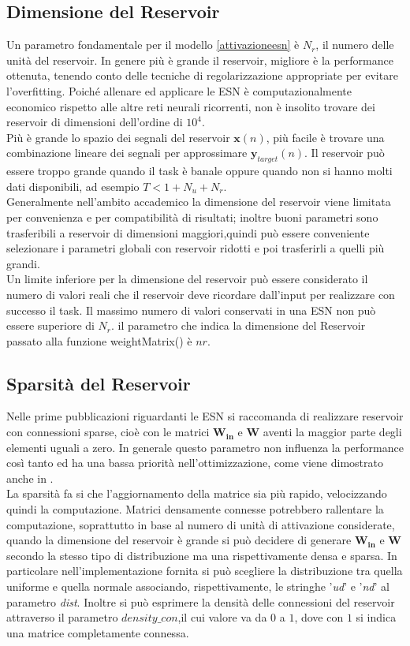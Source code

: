 \subsection{Dimensione del Reservoir}
Un parametro fondamentale per il modello \ref{attivazioneesn} è $N_r$, il numero delle unità del reservoir. In genere più è grande il reservoir, migliore è la performance ottenuta, tenendo conto delle tecniche di regolarizzazione appropriate per evitare l'overfitting. Poiché allenare ed applicare le ESN è computazionalmente economico rispetto alle altre reti neurali ricorrenti, non è insolito trovare dei reservoir di dimensioni dell'ordine di $10^4$.\\
Più è grande lo spazio dei segnali del reservoir $\mathbf{x}(n)$, più facile è trovare una combinazione lineare dei segnali per approssimare $\mathbf{y}_{target}(n)$. Il reservoir può essere troppo grande quando il task è banale oppure quando non si hanno molti dati disponibili, ad esempio $T< 1+ N_u +N_r$.\\
Generalmente nell'ambito accademico la dimensione del reservoir viene limitata per convenienza e per compatibilità di risultati; inoltre buoni parametri sono trasferibili a reservoir di dimensioni maggiori,quindi può essere conveniente selezionare i parametri globali con reservoir ridotti e poi trasferirli a quelli più grandi.\\
Un limite inferiore per la dimensione del reservoir può essere considerato il numero di valori reali che il reservoir deve ricordare dall'input per realizzare con successo il task. Il massimo numero di valori conservati in una ESN non può essere superiore di $N_r$.
il parametro che indica la dimensione del Reservoir  passato alla funzione weightMatrix() è $nr$.

\subsection{Sparsità del Reservoir}
Nelle prime pubblicazioni riguardanti le ESN si raccomanda di realizzare reservoir con connessioni sparse, cioè con le matrici $\mathbf{W_{in}}$ e $\mathbf{W}$ aventi la maggior parte degli elementi uguali a zero.
In generale questo parametro non influenza la performance così tanto ed ha una bassa priorità nell'ottimizzazione, come viene dimostrato anche in \cite{Markovianfactor:paper}.\\
La sparsità fa si che l'aggiornamento della matrice sia più rapido, velocizzando quindi la computazione. Matrici densamente connesse potrebbero rallentare la computazione, soprattutto in base al numero di unità di attivazione considerate, quando la dimensione del reservoir è grande si può decidere di generare $\mathbf{W_{in}}$ e $\mathbf{W}$ secondo la stesso tipo di distribuzione ma una rispettivamente densa e sparsa. In particolare nell'implementazione fornita si può scegliere la distribuzione tra quella uniforme e quella normale associando, rispettivamente, le stringhe '\textit{ud}' e '\textit{nd}' al parametro \textit{dist}. Inoltre si può esprimere la densità delle connessioni del reservoir attraverso il parametro $\mathit{density\_con}$,il cui valore va da $0$ a $1$, dove con $1$ si indica una matrice completamente connessa. 

